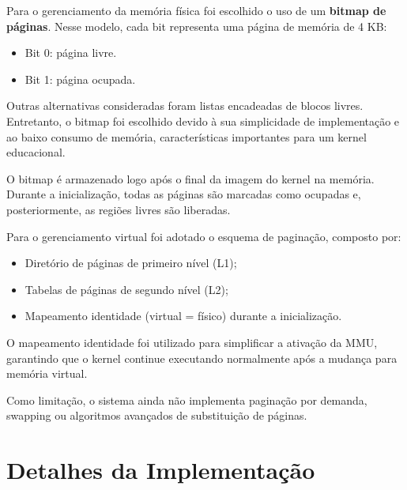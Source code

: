 Para o gerenciamento da memória física foi escolhido o uso de um \textbf{bitmap de páginas}. Nesse modelo, cada bit representa uma página de memória de 4 KB:

\begin{itemize}
\item Bit 0: página livre.
\item Bit 1: página ocupada.
\end{itemize}

Outras alternativas consideradas foram listas encadeadas de blocos livres. Entretanto, o bitmap foi escolhido devido à sua simplicidade de implementação e ao baixo consumo de memória, características importantes para um kernel educacional.

O bitmap é armazenado logo após o final da imagem do kernel na memória. Durante a inicialização, todas as páginas são marcadas como ocupadas e, posteriormente, as regiões livres são liberadas.

Para o gerenciamento virtual foi adotado o esquema de paginação, composto por:

\begin{itemize}
\item Diretório de páginas de primeiro nível (L1);
\item Tabelas de páginas de segundo nível (L2);
\item Mapeamento identidade (virtual = físico) durante a inicialização.
\end{itemize}

O mapeamento identidade foi utilizado para simplificar a ativação da MMU, garantindo que o kernel continue executando normalmente após a mudança para memória virtual.

Como limitação, o sistema ainda não implementa paginação por demanda, swapping ou algoritmos avançados de substituição de páginas.


\section{Detalhes da Implementação}
%
%

